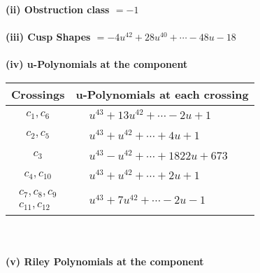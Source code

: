 \documentclass[1p]{elsarticle_modified}
\theoremstyle{definition}
\begin{document}
\flushleft \textbf{(ii) Obstruction class $= -1$}\\~\\
\flushleft \textbf{(iii) Cusp Shapes $= -4 u^{42}+28 u^{40}+\cdots-48 u-18$}\\~\\
\newpage\renewcommand{\arraystretch}{1}
\flushleft \textbf{(iv) u-Polynomials at the component}\newline \\
\begin{tabular}{m{50pt}|m{274pt}}
Crossings & \hspace{64pt}u-Polynomials at each crossing \\
\hline $$\begin{aligned}c_{1},c_{6}\end{aligned}$$&$\begin{aligned}
&u^{43}+13 u^{42}+\cdots-2 u+1
\end{aligned}$\\
\hline $$\begin{aligned}c_{2},c_{5}\end{aligned}$$&$\begin{aligned}
&u^{43}+u^{42}+\cdots+4 u+1
\end{aligned}$\\
\hline $$\begin{aligned}c_{3}\end{aligned}$$&$\begin{aligned}
&u^{43}- u^{42}+\cdots+1822 u+673
\end{aligned}$\\
\hline $$\begin{aligned}c_{4},c_{10}\end{aligned}$$&$\begin{aligned}
&u^{43}+u^{42}+\cdots+2 u+1
\end{aligned}$\\
\hline $$\begin{aligned}c_{7},c_{8},c_{9}\\c_{11},c_{12}\end{aligned}$$&$\begin{aligned}
&u^{43}+7 u^{42}+\cdots-2 u-1
\end{aligned}$\\
\hline
\end{tabular}\\~\\
\newpage\renewcommand{\arraystretch}{1}
\flushleft \textbf{(v) Riley Polynomials at the component}\newline \\
\end{document}
